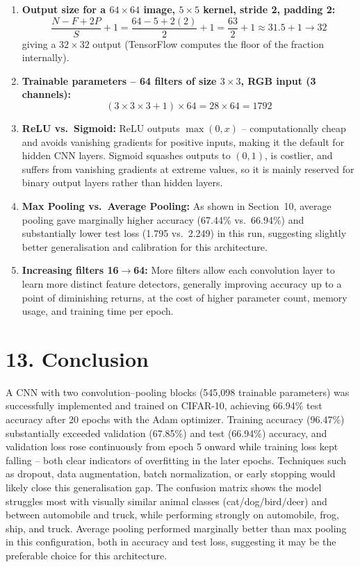 \documentclass[11pt]{article}
\begin{document}
\begin{enumerate}[leftmargin=*]

\item \textbf{Output size for a $64\times64$ image, $5\times5$ kernel, stride 2, padding 2:}
\[
\frac{N - F + 2P}{S} + 1 = \frac{64 - 5 + 2(2)}{2} + 1 = \frac{63}{2} + 1 \approx 31.5 + 1 \rightarrow 32
\]
giving a $32\times32$ output (TensorFlow computes the floor of the fraction internally).

\item \textbf{Trainable parameters -- 64 filters of size $3\times3$, RGB input (3 channels):}
\[
(3 \times 3 \times 3 + 1) \times 64 = 28 \times 64 = 1792
\]

\item \textbf{ReLU vs.\ Sigmoid:} ReLU outputs $\max(0,x)$ -- computationally cheap and avoids vanishing gradients for positive inputs, making it the default for hidden CNN layers. Sigmoid squashes outputs to $(0,1)$, is costlier, and suffers from vanishing gradients at extreme values, so it is mainly reserved for binary output layers rather than hidden layers.

\item \textbf{Max Pooling vs.\ Average Pooling:} As shown in Section~10, average pooling gave marginally higher accuracy (67.44\% vs.\ 66.94\%) and substantially lower test loss (1.795 vs.\ 2.249) in this run, suggesting slightly better generalisation and calibration for this architecture.

\item \textbf{Increasing filters 16$\rightarrow$64:} More filters allow each convolution layer to learn more distinct feature detectors, generally improving accuracy up to a point of diminishing returns, at the cost of higher parameter count, memory usage, and training time per epoch.

\end{enumerate}

\section*{13. Conclusion}

A CNN with two convolution--pooling blocks (545{,}098 trainable parameters) was successfully implemented and trained on CIFAR-10, achieving 66.94\% test accuracy after 20 epochs with the Adam optimizer. Training accuracy (96.47\%) substantially exceeded validation (67.85\%) and test (66.94\%) accuracy, and validation loss rose continuously from epoch 5 onward while training loss kept falling -- both clear indicators of overfitting in the later epochs. Techniques such as dropout, data augmentation, batch normalization, or early stopping would likely close this generalisation gap. The confusion matrix shows the model struggles most with visually similar animal classes (cat/dog/bird/deer) and between automobile and truck, while performing strongly on automobile, frog, ship, and truck. Average pooling performed marginally better than max pooling in this configuration, both in accuracy and test loss, suggesting it may be the preferable choice for this architecture.
\end{document}
